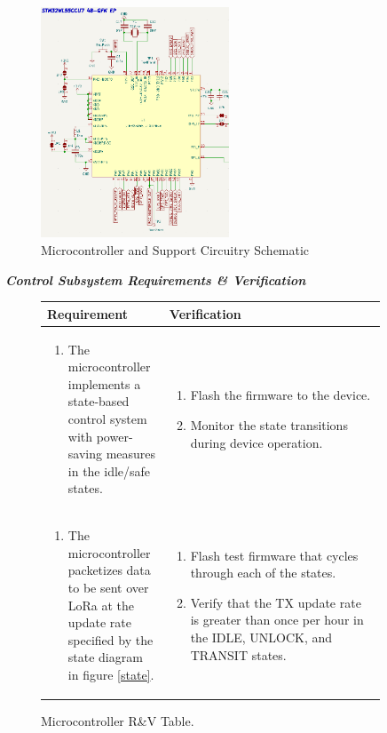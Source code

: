 \documentclass{article}
\begin{document}
\begin{figure}[H]
	\begin{centering}
	\includegraphics[width=0.5\textwidth]{mcu_schematic.png}
	\caption{Microcontroller and Support Circuitry Schematic}
	\end{centering}
\end{figure}

\textit{\textbf{Control Subsystem Requirements \& Verification}}


\begin{figure}[H]
	\begin{center}
		\begin{tabular}{|p{0.3 \linewidth}|p{0.6 \linewidth}|}
			\hline
			Requirement & Verification  \\
			\hline
			\begin{enumerate}
				\item  The microcontroller implements a state-based control system with power-saving measures in the idle/safe states.  
			\end{enumerate} &
		\begin{enumerate}
			\item Flash the firmware to the device. 
			\item Monitor the state transitions during device operation. 
		\end{enumerate}  \\
			\hline
			\begin{enumerate}
				\item The microcontroller packetizes data to be sent over LoRa at the update rate specified by the state diagram in figure \ref{state}.
			\end{enumerate} & \begin{enumerate}
			\item Flash test firmware that cycles through each of the states. 
			\item Verify that the TX update rate is greater than once per hour in the IDLE, UNLOCK, and TRANSIT states. 
		\end{enumerate} \\
			\hline 
		\end{tabular}
	\end{center}
	\caption{Microcontroller R\&V Table.}
\end{figure}
\end{document}
